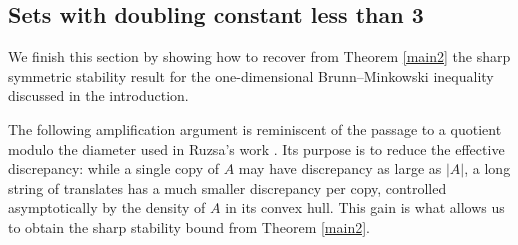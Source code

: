 \documentclass[11pt,reqno]{amsart}
\theoremstyle{definition}
\begin{document}
\subsection{Sets with doubling constant less than 3}

We finish this section by showing how to recover from Theorem \ref{main2} the sharp symmetric stability result for the one-dimensional Brunn--Minkowski inequality discussed in the introduction.

The following amplification argument is reminiscent of the passage to a quotient modulo the diameter used in Ruzsa's work \cite{Ruzsa1991}. Its purpose is to reduce the effective discrepancy: while a single copy of $A$ may have discrepancy as large as $|A|$, a long string of translates has a much smaller discrepancy per copy, controlled asymptotically by the density of $A$ in its convex hull. This gain is what allows us to obtain the sharp stability bound from Theorem \ref{main2}.
\end{document}
